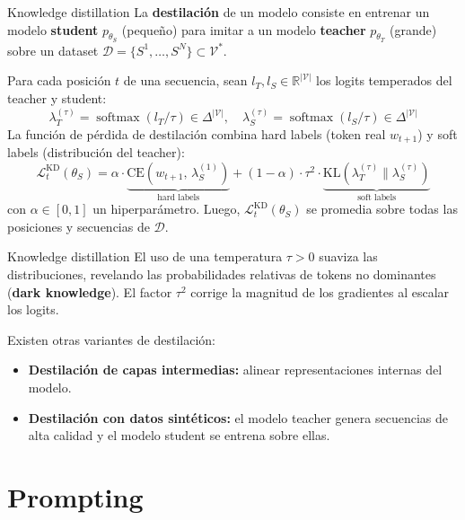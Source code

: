 \documentclass{beamer}
\newcommand{\R}{\mathbb{R}}
\begin{document}
\begin{frame}{Knowledge distillation}
    La \textbf{destilación} de un modelo consiste en entrenar un modelo \textbf{student} $p_{\theta_S}$ (pequeño) para imitar a un modelo \textbf{teacher} $p_{\theta_T}$ (grande) sobre un dataset $\mathcal{D}=\{S^1,\ldots,S^N\}\subset\mathcal{V}^*$.

    Para cada posición $t$ de una secuencia, sean $l_T,l_S\in\R^{|\mathcal{V}|}$ los logits temperados del teacher y student:
    \begin{equation*}
        \lambda_T^{(\tau)}=\operatorname{softmax}(l_T/\tau)\in\Delta^{|\mathcal{V}|},\quad \lambda_S^{(\tau)}=\operatorname{softmax}(l_S/\tau)\in\Delta^{|\mathcal{V}|}
    \end{equation*}
    La función de pérdida de destilación combina hard labels (token real $w_{t+1}$) y soft labels
    (distribución del teacher):
    \begin{equation*}
        \mathcal{L}^\text{KD}_t(\theta_S)=\alpha\cdot\underbrace{\text{CE}(w_{t+1},\,\lambda_S^{(1)})}_{\text{hard labels}}+(1-\alpha)\cdot\tau^2\cdot\underbrace{\text{KL}(\lambda_T^{(\tau)}\|\lambda_S^{(\tau)})}_{\text{soft labels}}
    \end{equation*}
    con $\alpha\in[0,1]$ un hiperparámetro. Luego, $\mathcal{L}^\text{KD}_t(\theta_S)$ se promedia sobre todas las posiciones y secuencias de $\mathcal{D}$.
\end{frame}

\begin{frame}{Knowledge distillation}
    El uso de una temperatura $\tau>0$ suaviza las distribuciones, revelando las probabilidades relativas de tokens no dominantes (\textbf{dark knowledge}). El factor $\tau^2$ corrige la magnitud de los gradientes al escalar los logits.

    Existen otras variantes de destilación:
    \begin{itemize}
        \item \textbf{Destilación de capas intermedias:} alinear representaciones internas del modelo.
        \item \textbf{Destilación con datos sintéticos:} el modelo teacher genera secuencias de alta calidad y el modelo student se entrena sobre ellas.
    \end{itemize}
\end{frame}

\section{Prompting}
\end{document}
